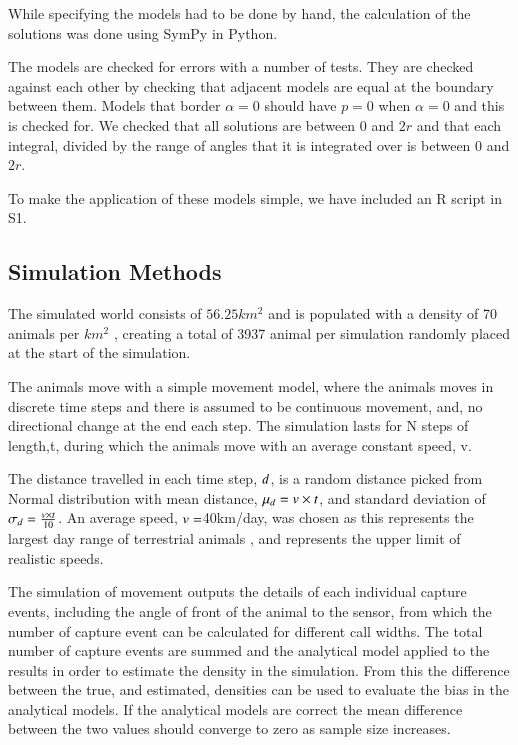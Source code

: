 \documentclass[a4paper,10pt,reqno,oneside]{amsart}
\begin{document}
While specifying the models had to be done by hand, the calculation of the solutions was done using SymPy \citep{sympy} in Python. 

The models are checked for errors with a number of tests. They are checked against each other by checking that adjacent models are equal at the boundary between them. Models that border $ \alpha = 0$ should have $p = 0$ when $ \alpha = 0$ and this is checked for. We checked that all solutions are between 0 and $2r$ and that each integral, divided by the range of angles that it is integrated over is between 0 and $2r$.

To make the application of these models simple, we have included an R script in S1. 

\subsection{Simulation Methods}

The simulated world consists of $56.25km^2$ and is populated with a density of  70 animals per $km^2$ \cite{damuth1981population}, creating a total of 3937 animal per simulation randomly placed at the start of the simulation. 

The animals move with a simple movement model, where the animals moves in discrete time steps and there is assumed to be continuous movement, and, no directional change at the end each step. The simulation lasts for N steps of length,t, during which the animals move with an average constant speed, v. 

The distance travelled in each time step, $\mathnormal{d}$, is a random distance picked from Normal distribution with mean distance, $\mu_d = \mathnormal{v} \times \mathnormal{t}$,  and standard deviation of $\sigma_d = \frac{\mathnormal{v} \times \mathnormal{t}}{10}$. An average speed, $\mathnormal{v} =$40km/day, was chosen as this represents the largest day range of terrestrial animals \cite{carbone2005far}, and represents the upper limit of realistic speeds.
  
The simulation of movement outputs the details of each individual capture events, including the angle of front of the animal to the sensor, from which the number of capture event can be calculated for different call widths. The total number of capture events are summed and the analytical model applied to the results in order to estimate the density in the simulation. From this the difference between the true, and estimated, densities can be used to evaluate the bias in the analytical models. If the analytical models are correct the mean difference between the two values should converge to zero as sample size increases. 
\end{document}
